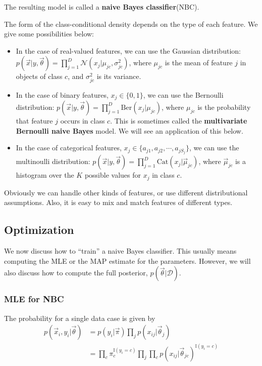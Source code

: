 \begin{refsection}
The resulting model is called a \textbf{naive Bayes classifier}(NBC).

The form of the class-conditional density depends on the type of each feature. We give some possibilities below:
\begin{itemize}
	\item{In the case of real-valued features, we can use the Gaussian distribution: $p(\vec{x}|y,\vec{\theta})=\prod_{j=1}^D \mathcal{N}(x_j|\mu_{jc},\sigma_{jc}^2)$, where $\mu_{jc}$ is the mean of feature $j$ in objects of class $c$, and $\sigma_{jc}^2$ is its variance.}
	\item{In the case of binary features, $x_j \in \{0,1\}$, we can use the Bernoulli distribution: $p(\vec{x}|y,\vec{\theta})=\prod_{j=1}^D \text{Ber}(x_j|\mu_{jc})$, where $\mu_{jc}$ is the probability that feature $j$ occurs in class $c$. This is sometimes called the \textbf{multivariate Bernoulli naive Bayes} model. We will see an application of this below.}
	\item{In the case of categorical features, $x_j \in \{a_{j1},a_{j2},\cdots, a_{jS_j}\}$, we can use the multinoulli distribution: $p(\vec{x}|y,\vec{\theta})=\prod_{j=1}^D \text{Cat}(x_j|\vec{\mu}_{jc})$, where $\vec{\mu}_{jc}$ is a histogram over the $K$ possible values for $x_j$ in class $c$.}
\end{itemize}

Obviously we can handle other kinds of features, or use different distributional assumptions. Also, it is easy to mix and match features of different types.


\subsection{Optimization}
\label{sec:NBC-Optimization}
We now discuss how to “train” a naive Bayes classifier. This usually means computing the MLE or the MAP estimate for the parameters. However, we will also discuss how to compute the full posterior, $p(\vec{\theta}|\mathcal{D})$.

\subsubsection{MLE for NBC}
The probability for a single data case is given by
\begin{equation}\begin{split}
p(\vec{x}_i,y_i|\vec{\theta}) & =p(y_i|\vec{\pi})\prod\limits_j p(x_{ij}|\vec{\theta}_j) \\
& =\prod\limits_c \pi_c^{\mathbb{I}(y_i=c)} \prod\limits_j\prod\limits_c p(x_{ij}|\vec{\theta}_{jc})^{\mathbb{I}(y_i=c)}
\end{split}\end{equation}


\end{refsection}
